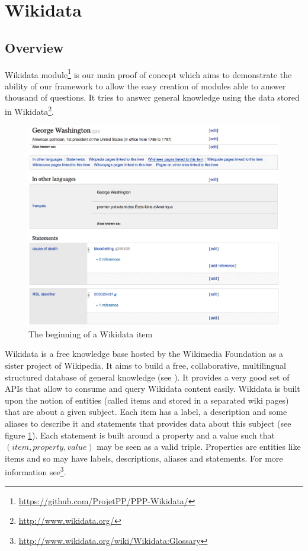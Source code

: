 \section{Wikidata}

\subsection{Overview}
Wikidata module\footnote{\url{https://github.com/ProjetPP/PPP-Wikidata/}} is our main proof of concept which aims to demonstrate the ability of our framework to allow the easy creation of modules able to answer thousand of questions. It tries to answer general knowledge using the data stored in Wikidata\footnote{\url{http://www.wikidata.org/}}.

\begin{figure}[!ht]
  \centering
    \label{wikidata:item-screenshot}
    \includegraphics[width=\textwidth]{./wikidata-item-screenshot.png}
    \caption{The beginning of a Wikidata item}
\end{figure}

Wikidata is a free knowledge base hosted by the Wikimedia Foundation as a sister project of Wikipedia. It aims to build a free, collaborative, multilingual structured database of general knowledge (see \cite{42240}). It provides a very good set of APIs that allow to consume and query Wikidata content easily. Wikidata is built upon the notion of entities (called items and stored in a separated wiki pages) that are about a given subject. Each item has a label, a description and some aliases to describe it and statements that provides data about this subject (see figure \ref{wikidata:item-screenshot}). Each statement is built around a property and a value such that $(item, property, value)$ may be seen as a valid triple. Properties are entities like items and so may have labels, descriptions, aliases and statements. For more information see\footnote{\url{http://www.wikidata.org/wiki/Wikidata:Glossary}}.

